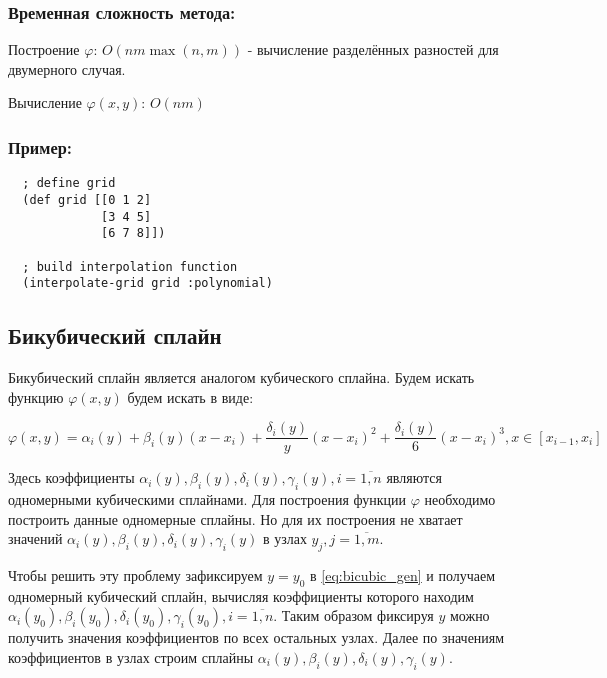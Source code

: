 \subsubsection{Временная сложность метода:}

Построение $\varphi$: $O(n m \max(n, m))$ - вычисление разделённых разностей для двумерного случая.

Вычисление $\varphi(x, y)$: $O(n m)$

\subsubsection{Пример:}

\begin{verbatim}
  ; define grid
  (def grid [[0 1 2]
             [3 4 5]
             [6 7 8]])

  ; build interpolation function
  (interpolate-grid grid :polynomial)
\end{verbatim}



\subsection{Бикубический сплайн}

Бикубический сплайн является аналогом кубического сплайна. Будем искать функцию $\varphi(x, y)$ будем искать в виде:

\begin{equation} \label{eq:bicubic_gen}
  \varphi(x, y) = \alpha_i(y) + \beta_i(y)(x - x_i) + \frac{\delta_i(y)}{y}(x - x_i)^2 + \frac{\delta_i(y)}{6}(x - x_i)^3, x \in [x_{i-1}, x_i]
\end{equation}

Здесь коэффициенты $\alpha_i(y), \beta_i(y), \delta_i(y), \gamma_i(y), i = \overline{1, n}$ являются одномерными кубическими сплайнами. Для построения функции $\varphi$ необходимо построить данные одномерные сплайны. Но для их построения не хватает значений $\alpha_i(y), \beta_i(y), \delta_i(y), \gamma_i(y)$ в узлах $y_j, j = \overline{1,m}$.

Чтобы решить эту проблему зафиксируем $y = y_0$ в \eqref{eq:bicubic_gen} и получаем одномерный кубический сплайн, вычисляя коэффициенты которого находим $\alpha_i(y_0), \beta_i(y_0), \delta_i(y_0), \gamma_i(y_0), i = \overline{1, n}$. Таким образом фиксируя $y$ можно получить значения коэффициентов по всех остальных узлах. Далее по значениям коэффициентов в узлах строим сплайны $\alpha_i(y), \beta_i(y), \delta_i(y), \gamma_i(y)$.

